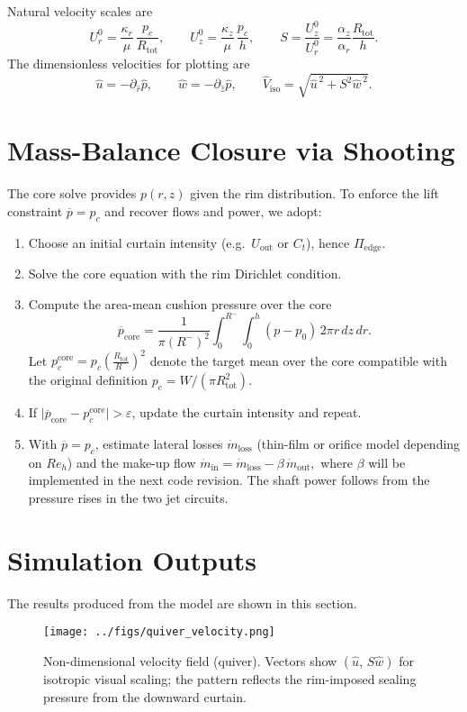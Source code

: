 \documentclass[11pt,a4paper]{article}
\begin{document}
Natural velocity scales are
\begin{equation}
  U_r^0=\frac{\kappa_r}{\mu}\,\frac{p_c}{R_{\mathrm{tot}}},\qquad
  U_z^0=\frac{\kappa_z}{\mu}\,\frac{p_c}{h},\qquad
  S=\frac{U_z^0}{U_r^0}=\frac{\alpha_z}{\alpha_r}\frac{R_{\mathrm{tot}}}{h}.
\end{equation}
The dimensionless velocities for plotting are
\begin{equation}
  \hat u=-\partial_{\hat r}\hat p,\qquad
  \hat w=-\partial_{\hat z}\hat p,\qquad
  \hat V_{\mathrm{iso}}=\sqrt{\hat u^{\,2}+S^{2}\hat w^{\,2}}.
\end{equation}

\section{Mass-Balance Closure via Shooting}
\label{sec:shooting}
The core solve provides $p(r,z)$ given the rim distribution. To enforce the lift
constraint $\overline{p}=p_c$ and recover flows and power, we adopt:
\begin{enumerate}
  \item Choose an initial curtain intensity (e.g.\ $U_{\mathrm{out}}$ or $C_t$), hence
        $\Pi_{\mathrm{edge}}$.
  \item Solve the core equation with the rim Dirichlet condition.
  \item Compute the area-mean cushion pressure over the core
  \[
    \overline{p}_{\mathrm{core}}=\frac{1}{\pi (R^-)^2}
    \int_0^{R^{-}}\!\!\int_0^h (p-p_0)\,2\pi r\,dz\,dr.
  \]
  Let $p_c^{\mathrm{core}} = p_c \left(\frac{R_{\mathrm{tot}}}{R^-}\right)^2$ denote the
  target mean over the core compatible with the original definition
  $p_c=W/(\pi R_{\mathrm{tot}}^2)$.
  \item If $\big|\overline{p}_{\mathrm{core}}-p_c^{\mathrm{core}}\big|>\varepsilon$, update
  the curtain intensity and repeat.

  \item With $\overline{p}=p_c$, estimate lateral losses $\dot m_{\mathrm{loss}}$ (thin-film
  or orifice model depending on $Re_h$) and the make-up flow
  \(
    \dot m_{\mathrm{in}}=\dot m_{\mathrm{loss}}-\beta\,\dot m_{\mathrm{out}},
  \)
  where $\beta$ will be implemented in the next code revision. The shaft power follows
  from the pressure rises in the two jet circuits.
\end{enumerate}


\section{Simulation Outputs}
The results produced from the model are shown in this section.
\begin{figure}[H]
  \centering
  \texttt{[image: ../figs/quiver\_velocity.png]}
  \caption{Non-dimensional velocity field (quiver).
Vectors show $(\hat u,\,S\hat w)$ for isotropic visual scaling; the pattern reflects the rim-imposed sealing pressure from the downward curtain.}
  \label{fig:quiver}
\end{figure}
\end{document}
